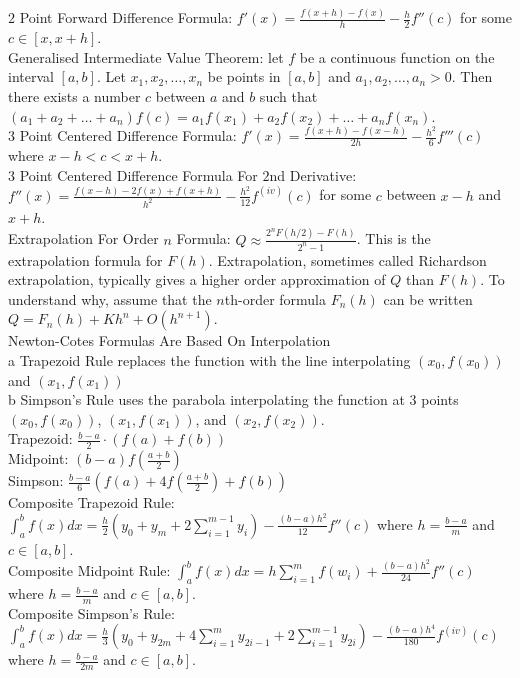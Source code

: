 $2$ Point Forward Difference Formula: $f'(x) = \frac{f(x+h)-f(x)}{h} - \frac{h}{2} f''(c)$ for some $c \in [x,x+h]$. \\
Generalised Intermediate Value Theorem: let $f$ be a continuous function on the interval $[a,b]$. Let $x_1,x_2,\dots,x_n$ be points in $[a,b]$ and $a_1,a_2,\dots,a_n > 0$. Then there exists a number $c$ between $a$ and $b$ such that $(a_1 + a_2 + \dots + a_n)f(c) = a_1 f(x_1) + a_2 f(x_2) + \dots + a_n f(x_n)$. \\
$3$ Point Centered Difference Formula: $f'(x) = \frac{f(x+h)-f(x-h)}{2h} - \frac{h^2}{6} f'''(c)$ where $x-h < c < x+h$. \\
$3$ Point Centered Difference Formula For $2$nd Derivative: $f''(x) = \frac{f(x-h)-2f(x)+f(x+h)}{h^2} - \frac{h^2}{12} f^{(iv)} (c)$ for some $c$ between $x-h$ and $x+h$. \\
Extrapolation For Order $n$ Formula: $Q \approx \frac{2^n F(h/2) - F(h)}{2^n - 1}$. This is the extrapolation formula for $F(h)$. Extrapolation, sometimes called Richardson extrapolation, typically gives a higher order approximation of $Q$ than $F(h)$. To understand why, assume that the $n$th-order formula $F_n (h)$ can be written $Q = F_n (h) + K h^n + O(h^{n+1})$. \\
Newton-Cotes Formulas Are Based On Interpolation \\
a Trapezoid Rule replaces the function with the line interpolating $(x_0,f(x_0))$ and $(x_1,f(x_1))$ \\
b Simpson's Rule uses the parabola interpolating the function at $3$ points $(x_0,f(x_0))$, $(x_1,f(x_1))$, and $(x_2,f(x_2))$. \\
Trapezoid: $\frac{b-a}{2} \cdot (f(a)+f(b))$ \\
Midpoint: $(b-a) f\left( \frac{a+b}{2} \right)$ \\
Simpson: $\frac{b-a}{6} \left( f(a)+4 f \left( \frac{a+b}{2} \right) + f(b) \right)$ \\
Composite Trapezoid Rule: $\int_a^b f(x)dx = \frac{h}{2} \left( y_0 + y_m + 2 \sum_{i=1}^{m-1} y_i \right) - \frac{(b-a) h^2}{12} f''(c)$ where $h = \frac{b-a}{m}$ and $c \in [a,b]$. \\
Composite Midpoint Rule: $\int_a^b f(x) dx = h \sum_{i=1}^m f(w_i) + \frac{(b-a) h^2}{24} f''(c)$ where $h=\frac{b-a}{m}$ and $c \in [a,b]$. \\
Composite Simpson's Rule: $\int_a^b f(x) dx = \frac{h}{3} \left( y_0 + y_{2m} + 4 \sum_{i=1}^m y_{2i-1} + 2 \sum_{i=1}^{m-1} y_{2i} \right) - \frac{(b-a) h^4}{180} f^{(iv)} (c)$ where $h = \frac{b-a}{2m}$ and $c \in [a,b]$. \\
